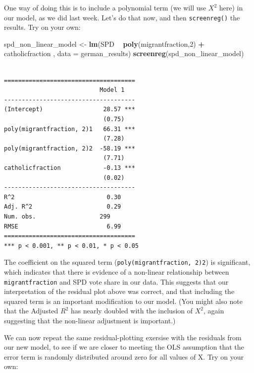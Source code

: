 \documentclass[]{article}
\newenvironment{Shaded}{\begin{snugshade}}{\end{snugshade}}
\newcommand{\KeywordTok}[1]{\textcolor[rgb]{0.13,0.29,0.53}{\textbf{#1}}}
\newcommand{\DataTypeTok}[1]{\textcolor[rgb]{0.13,0.29,0.53}{#1}}
\newcommand{\DecValTok}[1]{\textcolor[rgb]{0.00,0.00,0.81}{#1}}
\newcommand{\StringTok}[1]{\textcolor[rgb]{0.31,0.60,0.02}{#1}}
\newcommand{\OperatorTok}[1]{\textcolor[rgb]{0.81,0.36,0.00}{\textbf{#1}}}
\newcommand{\NormalTok}[1]{#1}
\theoremstyle{definition}
\theoremstyle{definition}
\theoremstyle{definition}
\theoremstyle{remark}
\begin{document}
One way of doing this is to include a polynomial term (we will use
\(X^2\) here) in our model, as we did last week. Let's do that now, and
then \texttt{screenreg()} the results. Try on your own:

\begin{Shaded}
\begin{Highlighting}[]
\NormalTok{spd_non_linear_model <-}\StringTok{ }\KeywordTok{lm}\NormalTok{(SPD }\OperatorTok{~}\StringTok{ }\KeywordTok{poly}\NormalTok{(migrantfraction,}\DecValTok{2}\NormalTok{) }\OperatorTok{+}\StringTok{ }\NormalTok{catholicfraction , }\DataTypeTok{data =}\NormalTok{ german_results)}
\KeywordTok{screenreg}\NormalTok{(spd_non_linear_model)}
\end{Highlighting}
\end{Shaded}

\begin{verbatim}

=====================================
                           Model 1   
-------------------------------------
(Intercept)                 28.57 ***
                            (0.75)   
poly(migrantfraction, 2)1   66.31 ***
                            (7.28)   
poly(migrantfraction, 2)2  -58.19 ***
                            (7.71)   
catholicfraction            -0.13 ***
                            (0.02)   
-------------------------------------
R^2                          0.30    
Adj. R^2                     0.29    
Num. obs.                  299       
RMSE                         6.99    
=====================================
*** p < 0.001, ** p < 0.01, * p < 0.05
\end{verbatim}

The coefficient on the squared term
(\texttt{poly(migrantfraction,\ 2)2}) is significant, which indicates
that there is evidence of a non-linear relationship between
\texttt{migrantfraction} and SPD vote share in our data. This suggests
that our interpretation of the residual plot above was correct, and that
including the squared term is an important modification to our model.
(You might also note that the Adjusted \(R^2\) has nearly doubled with
the inclusion of \(X^2\), again suggesting that the non-linear
adjustment is important.)

We can now repeat the same residual-plotting exersise with the residuals
from our new model, to see if we are closer to meeting the OLS
assumption that the error term is randomly distributed around zero for
all values of X. Try on your own:
\end{document}
